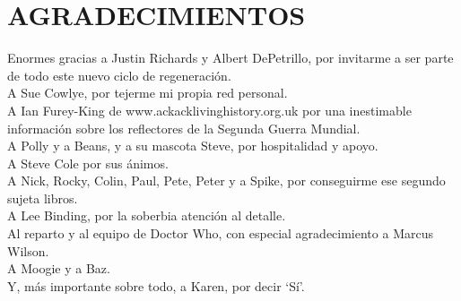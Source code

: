 \chapter*{AGRADECIMIENTOS}
Enormes gracias a Justin Richards y Albert DePetrillo, por invitarme a
ser parte de todo este nuevo ciclo de regeneración.\\
A Sue Cowlye, por tejerme mi propia red personal.\\
A Ian Furey-King de www.ackacklivinghistory.org.uk por una inestimable
información sobre los reflectores de la Segunda Guerra Mundial.\\
A Polly y a Beans, y a su mascota Steve, por hospitalidad y apoyo.\\
A Steve Cole por sus ánimos.\\
A Nick, Rocky, Colin, Paul, Pete, Peter y a Spike, por conseguirme ese
segundo sujeta libros.\\
A Lee Binding, por la soberbia atención al detalle.\\
Al reparto y al equipo de Doctor Who, con especial agradecimiento a
Marcus Wilson.\\
A Moogie y a Baz.\\
Y, más importante sobre todo, a Karen, por decir `Sí'.
